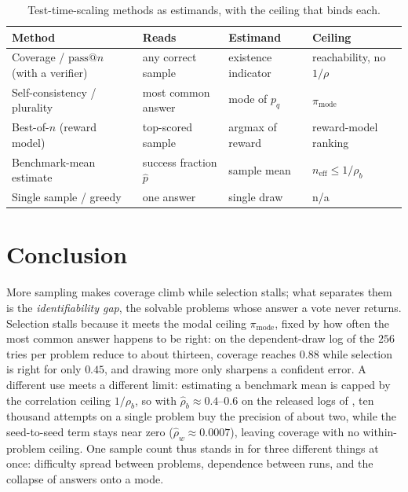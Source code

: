 \documentclass[11pt]{article}
\newcommand{\neff}{n_{\mathrm{eff}}}
\begin{document}
\begin{table}[H]
\centering
\caption{Test-time-scaling methods as estimands, with the ceiling that binds each.}
\label{tab:methods}
{\small
\setlength{\tabcolsep}{5pt}
\renewcommand{\arraystretch}{1.25}
\begin{tabular}{@{}llll@{}}
\toprule
\textbf{Method} & \textbf{Reads} & \textbf{Estimand} & \textbf{Ceiling} \\
\midrule
Coverage / $\mathrm{pass}@n$ (with a verifier) & any correct sample & existence indicator & reachability, no $1/\rho$ \\
Self-consistency / plurality & most common answer & mode of $p_q$ & $\pi_{\mathrm{mode}}$ \\
Best-of-$n$ (reward model) & top-scored sample & argmax of reward & reward-model ranking \\
\rowcolor{cnavy!9} Benchmark-mean estimate & success fraction $\hat p$ & sample mean & $\neff\le1/\rho_b$ \\
Single sample / greedy & one answer & single draw & n/a \\
\bottomrule
\end{tabular}}
\end{table}

\section{Conclusion}
\label{sec:conclusion}

More sampling makes coverage climb while selection stalls; what separates them is the \emph{identifiability gap}, the solvable problems whose answer a vote never returns. Selection stalls because it meets the modal ceiling $\pi_{\mathrm{mode}}$, fixed by how often the most common answer happens to be right: on the dependent-draw log of \citet{beeching2024scaling} the $256$ tries per problem reduce to about thirteen, coverage reaches $0.88$ while selection is right for only $0.45$, and drawing more only sharpens a confident error. A different use meets a different limit: estimating a benchmark mean is capped by the correlation ceiling $1/\rho_b$, so with $\hat\rho_b\approx0.4$--$0.6$ on the released logs of \citet{brown2024monkeys}, ten thousand attempts on a single problem buy the precision of about two, while the seed-to-seed term stays near zero ($\hat\rho_w\approx0.0007$), leaving coverage with no within-problem ceiling. One sample count thus stands in for three different things at once: difficulty spread between problems, dependence between runs, and the collapse of answers onto a mode.
\end{document}
